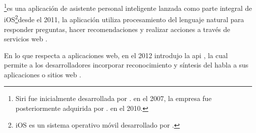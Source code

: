 \footnote{Siri fue inicialmente desarrollada por . en el 2007, 
la empresa fue posteriormente adquirida por . en el 2010.}es una aplicaci\'{o}n 
de asistente personal inteligente lanzada como parte integral de iOS\footnote{iOS es un sistema 
operativo m\'{o}vil desarrollado por .}desde el 2011, la aplicaci\'{o}n utiliza
procesamiento del lenguaje natural para responder preguntas, hacer recomendaciones y realizar acciones a
trav\'{e}s de servicios web \cite{AppleSiri}.

En lo que respecta a aplicaciones web, en el 2012  introdujo la \gls{api} 
, la cual permite a los desarrolladores incorporar 
reconocimiento y s\'{i}ntesis del habla a sus aplicaciones o sitios web \cite{GoogleWebSpeechAPI}.
